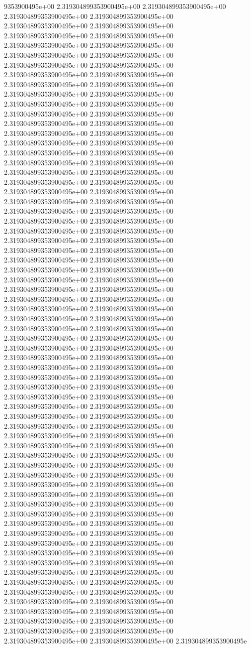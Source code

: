 9353900495e+00	2.319304899353900495e+00	2.319304899353900495e+00	2.319304899353900495e+00	2.319304899353900495e+00	2.319304899353900495e+00	2.319304899353900495e+00	2.319304899353900495e+00	2.319304899353900495e+00	2.319304899353900495e+00	2.319304899353900495e+00	2.319304899353900495e+00	2.319304899353900495e+00	2.319304899353900495e+00	2.319304899353900495e+00	2.319304899353900495e+00	2.319304899353900495e+00	2.319304899353900495e+00	2.319304899353900495e+00	2.319304899353900495e+00	2.319304899353900495e+00	2.319304899353900495e+00	2.319304899353900495e+00	2.319304899353900495e+00	2.319304899353900495e+00	2.319304899353900495e+00	2.319304899353900495e+00	2.319304899353900495e+00	2.319304899353900495e+00	2.319304899353900495e+00	2.319304899353900495e+00	2.319304899353900495e+00	2.319304899353900495e+00	2.319304899353900495e+00	2.319304899353900495e+00	2.319304899353900495e+00	2.319304899353900495e+00	2.319304899353900495e+00	2.319304899353900495e+00	2.319304899353900495e+00	2.319304899353900495e+00	2.319304899353900495e+00	2.319304899353900495e+00	2.319304899353900495e+00	2.319304899353900495e+00	2.319304899353900495e+00	2.319304899353900495e+00	2.319304899353900495e+00	2.319304899353900495e+00	2.319304899353900495e+00	2.319304899353900495e+00	2.319304899353900495e+00	2.319304899353900495e+00	2.319304899353900495e+00	2.319304899353900495e+00	2.319304899353900495e+00	2.319304899353900495e+00	2.319304899353900495e+00	2.319304899353900495e+00	2.319304899353900495e+00	2.319304899353900495e+00	2.319304899353900495e+00	2.319304899353900495e+00	2.319304899353900495e+00	2.319304899353900495e+00	2.319304899353900495e+00	2.319304899353900495e+00	2.319304899353900495e+00	2.319304899353900495e+00	2.319304899353900495e+00	2.319304899353900495e+00	2.319304899353900495e+00	2.319304899353900495e+00	2.319304899353900495e+00	2.319304899353900495e+00	2.319304899353900495e+00	2.319304899353900495e+00	2.319304899353900495e+00	2.319304899353900495e+00	2.319304899353900495e+00	2.319304899353900495e+00	2.319304899353900495e+00	2.319304899353900495e+00	2.319304899353900495e+00	2.319304899353900495e+00	2.319304899353900495e+00	2.319304899353900495e+00	2.319304899353900495e+00	2.319304899353900495e+00	2.319304899353900495e+00	2.319304899353900495e+00	2.319304899353900495e+00	2.319304899353900495e+00	2.319304899353900495e+00	2.319304899353900495e+00	2.319304899353900495e+00	2.319304899353900495e+00	2.319304899353900495e+00	2.319304899353900495e+00	2.319304899353900495e+00	2.319304899353900495e+00	2.319304899353900495e+00	2.319304899353900495e+00	2.319304899353900495e+00	2.319304899353900495e+00	2.319304899353900495e+00	2.319304899353900495e+00	2.319304899353900495e+00	2.319304899353900495e+00	2.319304899353900495e+00	2.319304899353900495e+00	2.319304899353900495e+00	2.319304899353900495e+00	2.319304899353900495e+00	2.319304899353900495e+00	2.319304899353900495e+00	2.319304899353900495e+00	2.319304899353900495e+00	2.319304899353900495e+00	2.319304899353900495e+00	2.319304899353900495e+00	2.319304899353900495e+00	2.319304899353900495e+00	2.319304899353900495e+00	2.319304899353900495e+00	2.319304899353900495e+00	2.319304899353900495e+00	2.319304899353900495e+00	2.319304899353900495e+00	2.319304899353900495e+00	2.319304899353900495e+00	2.319304899353900495e+00	2.319304899353900495e+00	2.319304899353900495e